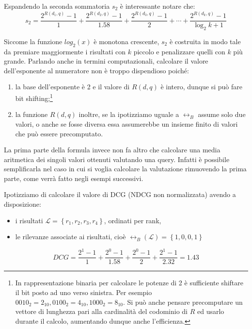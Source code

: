 Espandendo la seconda sommatoria $s_2$ è interessante notare che:
$$
s_2 = \frac{2^{R(d_1, q) } - 1}{1} + \frac{2^{R(d_2, q)} - 1}{1.58} + \frac{2^{R(d_3, q)} - 1}{2} + \dotsb + \frac{2^{R(d_k, q) } - 1}{\log_2{k + 1}}
$$

Siccome la funzione $log_2(x)$ è monotona crescente, $s_2$ è costruita in modo tale da
premiare maggiormente i risultati con $k$ piccolo e penalizzare quelli con $k$ più grande.
Parlando anche in termini computazionali, calcolare il valore dell'esponente al numeratore
non è troppo dispendioso poiché:

\begin{enumerate}
	\item la base dell'esponente è 2 e il valore di $R(d,q)$ è intero, dunque si può fare bit shifting;\footnote{In rappresentazione binaria per calcolare le potenze di 2 è sufficiente shiftare il bit posto ad uno verso sinistra. Per esempio $0010_2 = 2_{10}, 0100_2 = 4_{10}, 1000_2=8_{10}$. Si può anche pensare precomputare un vettore di lunghezza pari alla cardinalità del codominio di $R$ ed usarlo durante il calcolo, aumentando dunque anche l'efficienza. }
	\item la funzione $R(d,q)$ inoltre, se la ipotizziamo uguale a $\rel_B$ assume solo due valori,
	o anche se fosse diversa essa assumerebbe un insieme finito di valori che può essere precomputato.
\end{enumerate}

La prima parte della formula invece non fa altro che calcolare una media aritmetica
dei singoli valori ottenuti valutando una query. Infatti è possibile semplificarla
nel caso in cui si voglia calcolare la valutazione rimuovendo la prima parte, come verrà fatto
negli esempi successivi.

\begin{esempio}\label{eg:dcg}
	Ipotizziamo di calcolare il valore di DCG (NDCG non normalizzata) avendo a disposizione:
	\begin{itemize}
		\item i risultati $\mathcal{L} = \left\{r_1, r_2, r_3, r_4\right\}$, ordinati per rank,
		\item le rilevanze associate ai risultati, cioè $\rel_B\left(\mathcal{L}\right) = \left\{1, 0, 0, 1\right\}$
	\end{itemize}

$$
DCG = \frac{2^{1} - 1}{1} + \frac{2^{0} - 1}{1.58} + \frac{2^{0} - 1}{2} + \frac{2^{1} - 1}{2.32} = 1.43
$$
\end{esempio}

